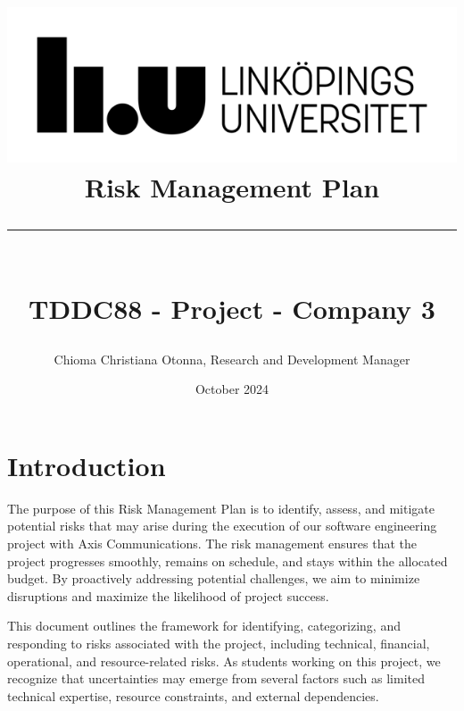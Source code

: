 \documentclass{article}
\begin{document}
   \title{
    \includegraphics[scale=1.5]{liu_logga.png} \\
    \vspace{2.0cm}
    \textbf{Risk Management Plan} \\
    \rule{\textwidth}{0.4pt} \\
    \large \textbf{TDDC88 - Project - Company 3}
}

\author{Chioma Christiana Otonna, Research and Development Manager }
\date{October 2024}

\maketitle

\newpage
 


\newpage
\section{Introduction}
The purpose of this Risk Management Plan is to identify, assess, and mitigate potential risks that may arise during the execution of our software engineering project with Axis Communications. The risk management ensures that the project progresses smoothly, remains on schedule, and stays within the allocated budget. By proactively addressing potential challenges, we aim to minimize disruptions and maximize the likelihood of project success.

This document outlines the framework for identifying, categorizing, and responding to risks associated with the project, including technical, financial, operational, and resource-related risks. As students working on this project, we recognize that uncertainties may emerge from several factors such as limited technical expertise, resource constraints, and external dependencies.
\end{document}
